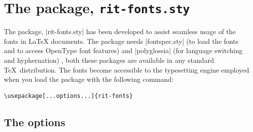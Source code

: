 \documentclass[onecolumn,final]{ltugboat}
\begin{document}
\section{The package, \texttt{rit-fonts.sty}} \label{sec:rit-fonts}

The package, |rit-fonts.sty| has been developed to assist seamless
usage of the fonts in \LaTeX{} documents. The package needs
|fontspec.sty| (to load the fonts and to access OpenType font
features) and |polyglossia| (for language switching and hyphernation)
\cite{fontspec,polyglossia}, both these packages are available in any
standard \TeX\ distribution.  The fonts become accessible to the
typesetting engine employed when you load the package with the
following command:

\begin{lstlisting}[xleftmargin=1.5\leftmargin]
  \usepackage[...options...]{rit-fonts}
\end{lstlisting}

\subsection{The options}
\end{document}
